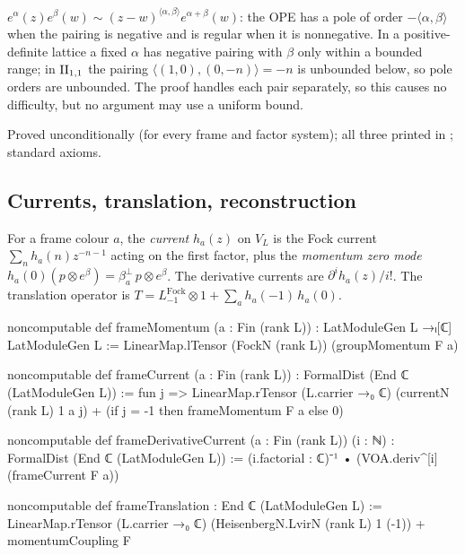 \begin{physics}
$e^\alpha(z)e^\beta(w)\sim(z-w)^{\langle\alpha,\beta\rangle}e^{\alpha+\beta}(w)$: the OPE has a pole of order $-\langle\alpha,\beta\rangle$ when
the pairing is negative and is regular when it is nonnegative.  In a positive-definite lattice a fixed $\alpha$ has negative pairing with $\beta$ only
within a bounded range; in ${\mathrm{II}_{1,1}}$ the pairing $\langle(1,0),(0,-n)\rangle=-n$ is unbounded below, so pole orders are
unbounded.  The proof handles each pair separately, so this causes no difficulty, but no argument may use a uniform
bound.
\end{physics}

\begin{status}
Proved unconditionally (for every frame and factor system); all three printed in
; standard axioms.
\end{status}

\subsection{Currents, translation, reconstruction}

\begin{definition}\label{ch17:def:currents}
For a frame colour $a$, the \emph{current} $h_a(z)$ on $V_L$ is the Fock current $\sum_nh_a(n)z^{-n-1}$
acting on the first factor, plus the \emph{momentum zero mode} $h_a(0)(p\otimes e^\beta)=\beta^\perp_a\,p\otimes e^\beta$.
The derivative currents are $\partial^ih_a(z)/i!$.  The translation operator is
$T=L^{\mathrm{Fock}}_{-1}\otimes1+\sum_ah_a(-1)\,h_a(0)$.
\end{definition}

\begin{leancode}
noncomputable def frameMomentum (a : Fin (rank L)) : LatModuleGen L →ₗ[ℂ] LatModuleGen L :=
  LinearMap.lTensor (FockN (rank L)) (groupMomentum F a)

noncomputable def frameCurrent (a : Fin (rank L)) : FormalDist (End ℂ (LatModuleGen L)) :=
  fun j => LinearMap.rTensor (L.carrier →₀ ℂ) (currentN (rank L) 1 a j)
    + (if j = -1 then frameMomentum F a else 0)

noncomputable def frameDerivativeCurrent (a : Fin (rank L)) (i : ℕ) : FormalDist (End ℂ (LatModuleGen L)) :=
  (i.factorial : ℂ)⁻¹ • (VOA.deriv^[i] (frameCurrent F a))

noncomputable def frameTranslation : End ℂ (LatModuleGen L) :=
  LinearMap.rTensor (L.carrier →₀ ℂ) (HeisenbergN.LvirN (rank L) 1 (-1)) + momentumCoupling F
\end{leancode}

